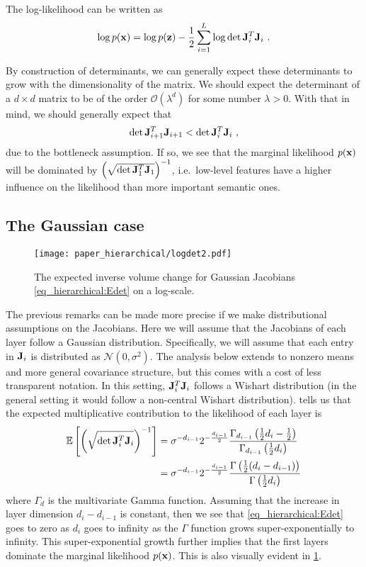 {The log-likelihood can be written as
\begin{equation}
    \log p({\mathbf{x}}) = \log p({\mathbf{z}}) - \frac{1}{2} \sum_{i=1}^L \log \det {\mathbf{J}}_i^T{\mathbf{J}}_i \ .
\end{equation}

By construction of determinants, we can generally expect these determinants to grow with the dimensionality of the matrix.
We should expect the determinant of a $d \times d$ matrix to be of the order $\mathcal{O}(\lambda^d)$ for some number $\lambda>0$.
With that in mind, we should generally expect that
\begin{align}
    \det {\mathbf{J}}_{i+1}^T {\mathbf{J}}_{i+1} < \det {\mathbf{J}}_i^T {\mathbf{J}}_i \ ,
\end{align}
due to the bottleneck assumption.
If so, we see that the marginal likelihood $p({\mathbf{x}})$ will be dominated by $\left(\sqrt{\det {\mathbf{J}}_1^T {\mathbf{J}}_1}\right)^{-1}$, i.e.\ low-level features have a higher influence on the likelihood than more important semantic ones.

\subsection{The Gaussian case}
%
\begin{figure}[t]
    \centering
    \texttt{[image: paper\_hierarchical/logdet2.pdf]}
    \caption{The expected inverse volume change for Gaussian Jacobians \eqref{eq_hierarchical:Edet} on a log-scale.}
    \label{fig_hierarchical:Edet}
\end{figure}
The previous remarks can be made more precise if we make distributional assumptions on the Jacobians.
Here we will assume that the Jacobians of each layer follow a Gaussian distribution.
Specifically, we will assume that each entry in ${\mathbf{J}}_i$ is distributed as $\mathcal{N}(0, \sigma^2)$.
The analysis below extends to nonzero means and more general covariance structure, but this comes with a cost of less transparent notation.
In this setting, ${\mathbf{J}}_i^T {\mathbf{J}}_i$ follows a Wishart distribution (in the general setting it would follow a non-central Wishart distribution).
\textcite{muirhead_aspects_2009} tells us that the expected multiplicative contribution to the likelihood of each layer is
\begin{align}
    \mathbb{E}\left[ \left(\sqrt{\det \Jb_i^T \Jb_i}\right)^{-1} \right]
    &= \sigma^{-d_{i-1}}  2^{-\frac{d_{i-1}}{2}} \frac{\Gamma_{d_{i-1}}\left( \frac{1}{2} d_{i} - \frac{1}{2} \right)}{\Gamma_{d_{i-1}}\left( \frac{1}{2} d_{i} \right)} \notag \\
    &= \sigma^{-d_{i-1}}  2^{-\frac{d_{i-1}}{2}} \frac{\Gamma\left( \frac{1}{2} (d_{i} - d_{i-1}) \right)}{\Gamma\left( \frac{1}{2} d_{i} \right)}
    \label{eq_hierarchical:Edet}
\end{align}
where $\Gamma_d$ is the multivariate Gamma function.
Assuming that the increase in layer dimension $d_{i} - d_{i-1}$ is constant, then we see that \eqref{eq_hierarchical:Edet} goes to zero as $d_{i}$ goes to infinity as the $\Gamma$ function grows super-exponentially to infinity.
This super-exponential growth further implies that the first layers dominate the marginal likelihood $p({\mathbf{x}})$.
This is also visually evident in \cref{fig_hierarchical:Edet}.

}
